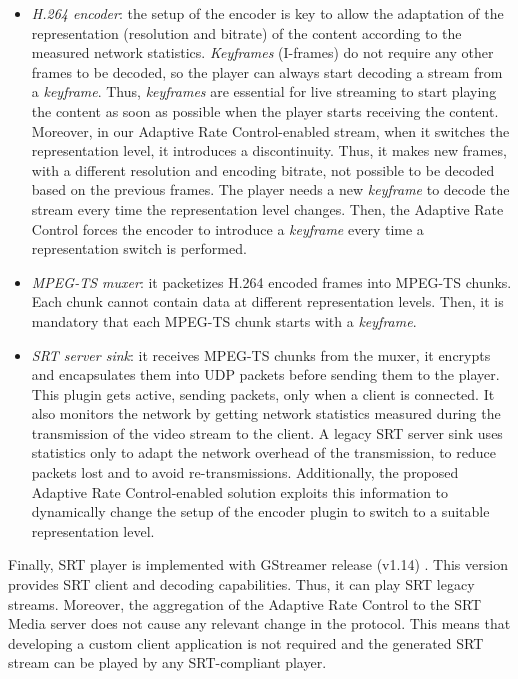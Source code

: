 \begin{itemize}
	\item \textit{H.264 encoder}: the setup of the encoder is key to allow the adaptation of the representation (resolution and bitrate) of the content according to the measured network statistics. \textit{Keyframes} (I-frames) do not require any other frames to be decoded, so the player can always start decoding a stream from a \textit{keyframe}. Thus, \textit{keyframes} are essential for live streaming to start playing the content as soon as possible when the player starts receiving the content. Moreover, in our Adaptive Rate Control-enabled stream, when it switches the representation level, it introduces a discontinuity. Thus, it makes new frames, with a different resolution and encoding bitrate, not possible to be decoded based on the previous frames. The player needs a new \textit{keyframe} to decode the stream every time the representation level changes. Then, the Adaptive Rate Control forces the encoder to introduce a \textit{keyframe} every time a representation switch is performed.
	\item \textit{MPEG-TS muxer}: it packetizes H.264 encoded frames into MPEG-TS chunks. Each chunk cannot contain data at different representation levels. Then, it is mandatory that each MPEG-TS chunk starts with a \textit{keyframe}.
	\item \textit{SRT server sink}: it receives MPEG-TS chunks from the muxer, it encrypts and encapsulates them into UDP packets before sending them to the player. This plugin gets active, sending packets, only when a client is connected.
	It also monitors the network by getting network statistics measured during the transmission of the video stream to the client. A legacy SRT server sink uses statistics only to adapt the network overhead of the transmission, to reduce packets lost and to avoid re-transmissions. Additionally, the proposed Adaptive Rate Control-enabled solution exploits this information to dynamically change the setup of the encoder plugin to switch to a suitable representation level.
\end{itemize}

Finally, SRT player is implemented with GStreamer release (v1.14) \cite{gstreamer}. This version provides SRT client and decoding capabilities. Thus, it can play SRT legacy streams. Moreover, the aggregation of the Adaptive Rate Control to the SRT Media server does not cause any relevant change in the protocol. This means that developing a custom client application is not required and the generated SRT stream can be played by any SRT-compliant player.

